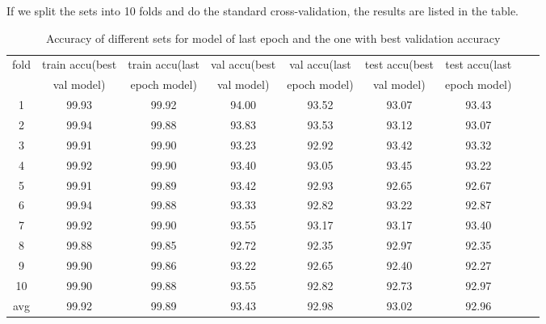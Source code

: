 If we split the sets into 10 folds and do the standard cross-validation, the results are listed in the table.
\begin{table}[!htbp]
	\centering
	\caption{Accuracy of different sets for model of last epoch and the one with best validation accuracy }
	\label{table:cv2}
	\begin{tabular}{|c|c|c|c|c|c|c|c|c|}
		\hline
%		
fold	&	train accu(best	&	train accu(last	&	val accu(best	&	val accu(last	&	test accu(best 	&	test accu(last	\\
	&	 val model)	&	 epoch model)	&	val model)	&	 epoch model)	&	val model)	&	 epoch model)	\\\hline
1	&	99.93	&	99.92	&	94.00	&	93.52	&	93.07	&	93.43	\\\hline
2	&	99.94	&	99.88	&	93.83	&	93.53	&	93.12	&	93.07	\\\hline
3	&	99.91	&	99.90	&	93.23	&	92.92	&	93.42	&	93.32	\\\hline
4	&	99.92	&	99.90	&	93.40	&	93.05	&	93.45	&	93.22	\\\hline
5	&	99.91	&	99.89	&	93.42	&	92.93	&	92.65	&	92.67	\\\hline
6	&	99.94	&	99.88	&	93.33	&	92.82	&	93.22	&	92.87	\\\hline
7	&	99.92	&	99.90	&	93.55	&	93.17	&	93.17	&	93.40	\\\hline
8	&	99.88	&	99.85	&	92.72	&	92.35	&	92.97	&	92.35	\\\hline
9	&	99.90	&	99.86	&	93.22	&	92.65	&	92.40	&	92.27	\\\hline
10	&	99.90	&	99.88	&	93.55	&	92.82	&	92.73	&	92.97	\\\hline
avg	&	99.92	&	99.89	&	93.43	&	92.98	&	93.02	&	92.96	\\\hline
	\end{tabular}
\end{table}

